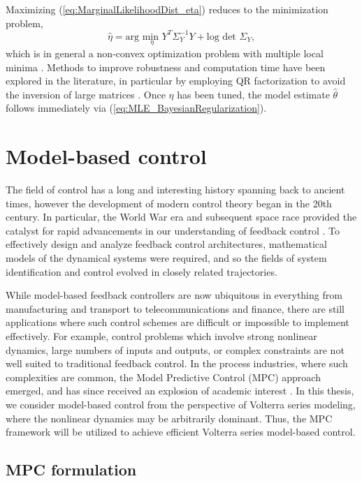 Maximizing (\ref{eq:MarginalLikelihoodDist_eta}) reduces to the minimization problem,
\begin{equation}
\hat{\eta} = \text{arg } \underset{\eta}{\text{min }} Y^T \Sigma_Y^{-1} Y + \text{log det } \Sigma_Y,
\label{eq:MarginalLikelihood_opt}
\end{equation}
which is in general a non-convex optimization problem with multiple local minima \cite{Rasmussen2006}. Methods to improve robustness and computation time have been explored in the literature, in particular by employing QR factorization to avoid the inversion of large matrices \cite{Chen2013}. Once $\eta$ has been tuned, the model estimate $\hat{\theta}$ follows immediately via (\ref{eq:MLE_BayesianRegularization}).

\section{Model-based control}

The field of control has a long and interesting history spanning back to ancient times, however the development of modern control theory began in the 20th century. In particular, the World War era and subsequent space race provided the catalyst for rapid advancements in our understanding of feedback control \cite{Goodwin2001}. To effectively design and analyze feedback control architectures, mathematical models of the dynamical systems were required, and so the fields of system identification and control evolved in closely related trajectories.

While model-based feedback controllers are now ubiquitous in everything from manufacturing and transport to telecommunications and finance, there are still applications where such control schemes are difficult or impossible to implement effectively. For example, control problems which involve strong nonlinear dynamics, large numbers of inputs and outputs, or complex constraints are not well suited to traditional feedback control. In the process industries, where such complexities are common, the Model Predictive Control (MPC) approach emerged, and has since received an explosion of academic interest \cite{Camacho1999}. In this thesis, we consider model-based control from the perspective of Volterra series modeling, where the nonlinear dynamics may be arbitrarily dominant. Thus, the MPC framework will be utilized to achieve efficient Volterra series model-based control.

\subsection{MPC formulation}

